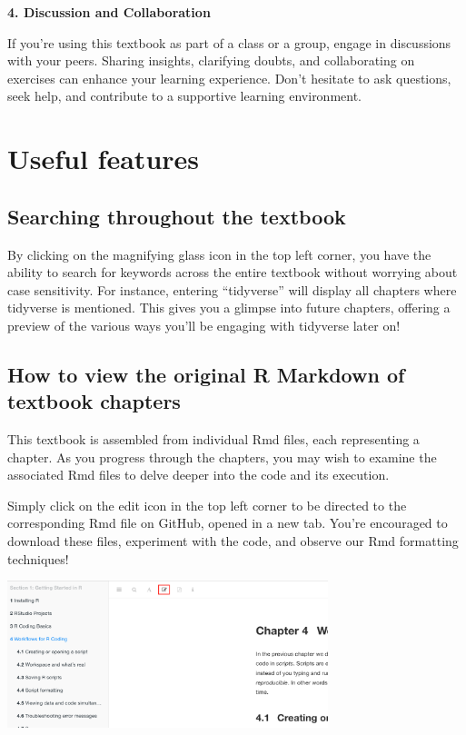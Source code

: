\documentclass[
]{book}
\begin{document}
\textbf{4. Discussion and Collaboration}

If you're using this textbook as part of a class or a group, engage in discussions with your peers. Sharing insights, clarifying doubts, and collaborating on exercises can enhance your learning experience. Don't hesitate to ask questions, seek help, and contribute to a supportive learning environment.

\hypertarget{useful-features}{%
\section{Useful features}\label{useful-features}}

\hypertarget{searching-throughout-the-textbook}{%
\subsection{Searching throughout the textbook}\label{searching-throughout-the-textbook}}

By clicking on the magnifying glass icon in the top left corner, you have the ability to search for keywords across the entire textbook without worrying about case sensitivity. For instance, entering ``tidyverse'' will display all chapters where tidyverse is mentioned. This gives you a glimpse into future chapters, offering a preview of the various ways you'll be engaging with tidyverse later on!

\hypertarget{how-to-view-the-original-r-markdown-of-textbook-chapters}{%
\subsection{How to view the original R Markdown of textbook chapters}\label{how-to-view-the-original-r-markdown-of-textbook-chapters}}

This textbook is assembled from individual Rmd files, each representing a chapter. As you progress through the chapters, you may wish to examine the associated Rmd files to delve deeper into the code and its execution.

Simply click on the edit icon in the top left corner to be directed to the corresponding Rmd file on GitHub, opened in a new tab. You're encouraged to download these files, experiment with the code, and observe our Rmd formatting techniques!

\includegraphics[width=0.7\textwidth,height=\textheight]{images/view_source.png}
\end{document}
